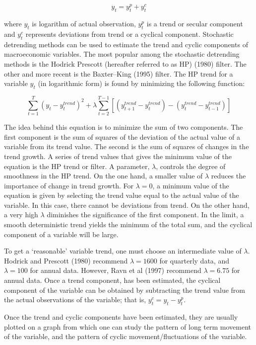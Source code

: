 \documentclass[12pt,a4paper,final]{article}
\begin{document}
\[ y_t = y_t^p + y_t^c \]

where $y_t$  is logarithm of actual observation, $y_t^p$  is a trend or secular component and $y_t^c$  represents deviations from trend or a cyclical component.  Stochastic detrending methods can be used to estimate the trend and cyclic components of macroeconomic variables. The most popular among the stochastic detrending methods is the Hodrick Prescott  (hereafter referred to as HP) (1980) filter.  The other and more recent is the Baxter--King (1995) filter. The HP trend for a variable $y_t$ (in logarithmic form) is found by minimizing the following function:

\[ \sum_{t=1}^T\left( y_t - y_t^{trend}\right) ^2 + \lambda \sum_{t=2}^{T-1} \left[ \left( y_{t+1}^{trend} - y_t^{trend}\right) -\left( y_t^{trend} - y_{t-1}^{trend}\right)  \right] \]

The idea behind this equation is to minimize the sum of two components.  The first component is the sum of squares of the deviation of the actual value of a variable from its trend value.  The second is the sum of squares of changes in the trend growth.  A series of trend values that gives the minimum value of the equation is the HP trend or filter.
A parameter, $\lambda$, controls the degree of smoothness in the HP trend.  On the one hand, a smaller value of $\lambda$ reduces the importance of change in trend growth.  For $\lambda = 0$, a minimum value of the equation is given by selecting the trend value equal to the actual value of the variable.  In this case, there cannot be deviations from trend.  On the other hand, a very high $\lambda$ diminishes the significance of the first component.  In the limit, a smooth deterministic trend yields the minimum of the total sum, and the cyclical component of a variable will be large. 

To get a `reasonable' variable trend, one must choose an intermediate value of $\lambda$.  Hodrick and Prescott (1980) recommend $\lambda = 1600$ for quarterly data, and $\lambda = 100$ for annual data.  However, Ravn et al (1997) recommend $\lambda = 6.75$ for annual data. Once a trend component, has been estimated, the cyclical component of the variable can be obtained by subtracting the trend value from the actual observations of the variable; that is, $y_t^c = y_t - y_t^p$. 

Once the trend and cyclic components have been estimated, they are usually plotted on a graph from which one can study the pattern of long term movement of the variable, and the pattern of cyclic movement/fluctuations of the variable.
\end{document}
